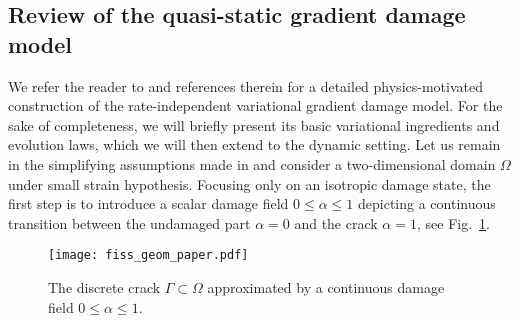 \subsection{Review of the quasi-static gradient damage model}
We refer the reader to \cite{PhamMarigo:2010,PhamMarigo:2010-1,SicsicMarigo:2013} and references therein for a detailed physics-motivated construction of the rate-independent variational gradient damage model. For the sake of completeness, we will briefly present its basic variational ingredients and evolution laws, which we will then extend to the dynamic setting. Let us remain in the simplifying assumptions made in \cite{SicsicMarigo:2013} and consider a two-dimensional domain $\Omega$ under small strain hypothesis. Focusing only on an isotropic damage state, the first step is to introduce a scalar damage field $0\leq\alpha\leq 1$ depicting a continuous transition between the undamaged part $\alpha=0$ and the crack $\alpha=1$, see Fig.~\ref{fig:fiss}.
\begin{figure}[htbp]
\centering
\texttt{[image: fiss\_geom\_paper.pdf]}
\caption{The discrete crack $\Gamma\subset\Omega$ approximated by a continuous damage field $0\leq\alpha\leq 1$.} \label{fig:fiss}
\end{figure}


